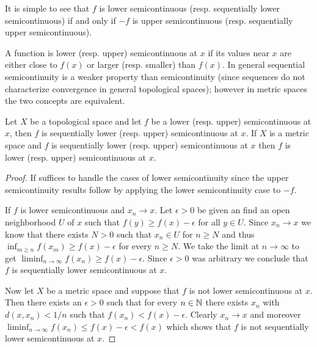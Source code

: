 It is simple to see that $f$ is lower semicontinuous
(resp. sequentially lower semicontinuous) if and only if $-f$ is upper
semicontinuous (resp. sequentially upper semicontinuous).

A function is lower (resp. upper) semicontinuous at $x$ if its values near $x$ are
either close to $f(x)$ or larger (resp. smaller) than $f(x)$.  In
general sequential semicontinuity is a weaker property than
semicontinuity (since sequences do not characterize convergence in
general topological spaces); however in metric spaces the two concepts
are equivalent.

\begin{prop}Let $X$ be a topological space and let $f$ be a lower
  (resp. upper) semicontinuous at $x$, then $f$ is sequentially
  lower (resp. upper) semicontinuous at $x$.  If $X$ is a metric space and
  $f$ is sequentially lower (resp. upper) semicontinuous at $x$ then $f$ is
  lower (resp. upper) semicontinuous at $x$.
\end{prop}
\begin{proof}If suffices to handle the cases of lower semicontinuity
  since the upper semicontinuity results follow by applying the lower
  semicontinuity case to $-f$.

If $f$ is lower semicontinuous and $x_n \to x$.  Let $\epsilon > 0$ be
given an find an open neighborhood $U$ of $x$ such that $f(y) \geq
f(x) - \epsilon$ for all $y \in U$.  Since $x_n \to x$ we know that
there exists $N > 0$  such that $x_n \in U$ for $n \geq N$ and thus
$\inf_{m \geq n} f(x_m) \geq f(x) - \epsilon$ for every $n \geq N$.
We take the limit at $n \to \infty$ to get $\liminf_{n \to \infty}
f(x_n) \geq f(x) - \epsilon$.  Since $\epsilon > 0$ was arbitrary we
conclude that $f$ is sequentially lower semicontinuous at $x$.

Now let $X$ be a metric space and suppose that $f$ is not
lower semicontinuous at $x$.  Then there exists an $\epsilon > 0$ such
that for every $n \in \mathbb{N}$ there exists $x_n$ with $d(x,x_n) <
1/n$ such that $f(x_n) < f(x) - \epsilon$.  Clearly $x_n \to x$ and
moreover $\liminf_{n \to \infty} f(x_n) \leq f(x) - \epsilon < f(x)$
which shows that $f$ is not sequentially lower semicontinuous at $x$.
\end{proof}

